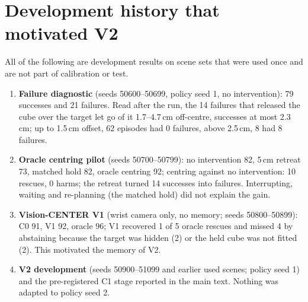 \section{Development history that motivated V2}\label{sec:s-history}

All of the following are development results on scene sets that were used once and are not part of calibration or test.
\begin{enumerate}
\item \textbf{Failure diagnostic} (seeds 50600--50699, policy seed 1, no intervention): 79 successes and 21 failures. Read after the run, the 14 failures that released the cube over the target let go of it 1.7--4.7\,cm off-centre, successes at most 2.3\,cm; up to 1.5\,cm offset, 62 episodes had 0 failures, above 2.5\,cm, 8 had 8 failures.
\item \textbf{Oracle centring pilot} (seeds 50700--50799): no intervention 82, 5\,cm retreat 73, matched hold 82, oracle centring 92; centring against no intervention: 10 rescues, 0 harms; the retreat turned 14 successes into failures. Interrupting, waiting and re-planning (the matched hold) did not explain the gain.
\item \textbf{Vision-CENTER V1} (wrist camera only, no memory; seeds 50800--50899): C0 91, V1 92, oracle 96; V1 recovered 1 of 5 oracle rescues and missed 4 by abstaining because the target was hidden (2) or the held cube was not fitted (2). This motivated the memory of V2.
\item \textbf{V2 development} (seeds 50900--51099 and earlier used scenes; policy seed 1) and the pre-registered C1 stage reported in the main text. Nothing was adapted to policy seed 2.
\end{enumerate}

